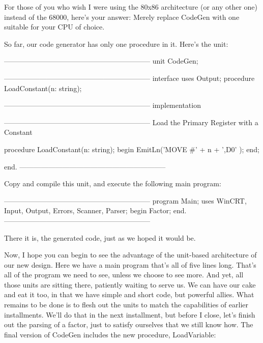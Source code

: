 \documentclass[float=false, crop=false]{standalone}
\begin{document}
For those of you who wish I were using the 80x86 architecture (or any other one)
instead of the 68000, here's your answer: Merely replace CodeGen with one
suitable for your CPU of choice.

So far, our code generator has only one procedure in it. Here's the unit:

\begin{code}
{--------------------------------------------------------------}
unit CodeGen;

{--------------------------------------------------------------}
interface
uses Output;
procedure LoadConstant(n: string);

{--------------------------------------------------------------}
implementation

{--------------------------------------------------------------}
{ Load the Primary Register with a Constant }

procedure LoadConstant(n: string);
begin
	EmitLn('MOVE #' + n + ',D0' );
end;

end.
{--------------------------------------------------------------}


Copy and compile this unit, and execute the following main
program:

{--------------------------------------------------------------}
program Main;
uses WinCRT, Input, Output, Errors, Scanner, Parser;
begin
	Factor;
end.
{--------------------------------------------------------------}
\end{code}

There it is, the generated code, just as we hoped it would be.

Now, I hope you can begin to see the advantage of the unit-based architecture of
our new design. Here we have a main program that's all of five lines long.
That's all of the program we need to see, unless we choose to see more. And yet,
all those units are sitting there, patiently waiting to serve us. We can have
our cake and eat it too, in that we have simple and short code, but powerful
allies. What remains to be done is to flesh out the units to match the
capabilities of earlier installments. We'll do that in the next installment, but
before I close, let's finish out the parsing of a factor, just to satisfy
ourselves that we still know how. The final version of CodeGen includes the new
procedure, LoadVariable:
\end{document}
